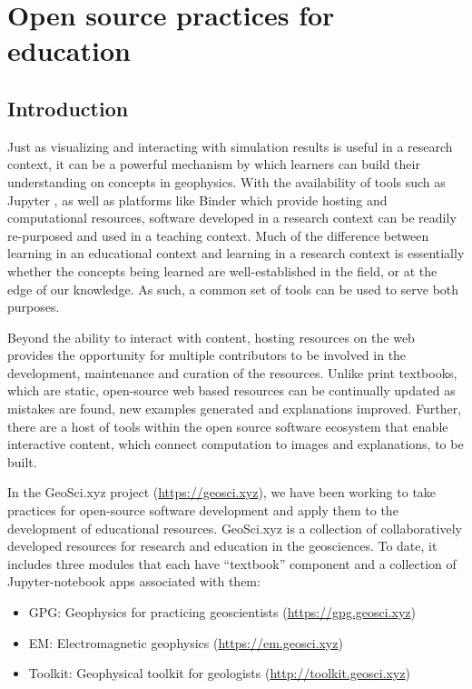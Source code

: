 
\chapter{Open source practices for education}
\label{app:education}

\section{Introduction}
Just as visualizing and interacting with simulation results is useful in a research context, it can be a powerful mechanism by which learners can build their understanding on concepts in geophysics. With the availability of tools such as Jupyter \citep{Perez2015}, as well as platforms like Binder \citep{ProjectJupyter2018} which provide hosting and computational resources, software developed in a research context can be readily re-purposed and used in a teaching context. Much of the difference between learning in an educational context and learning in a research context is essentially whether the concepts being learned are well-established in the field, or at the edge of our knowledge. As such, a common set of tools can be used to serve both purposes.

Beyond the ability to interact with content, hosting resources on the web provides the opportunity for multiple contributors to be involved in the development, maintenance and curation of the resources. Unlike print textbooks, which are static, open-source web based resources can be continually updated as mistakes are found, new examples generated and explanations improved. Further, there are a host of tools within the open source software ecosystem that enable interactive content, which connect computation to images and explanations, to be built.

In the GeoSci.xyz project (\href{https://geosci.xyz}{https://geosci.xyz}), we have been working to take practices for open-source software development and apply them to the development of educational resources. GeoSci.xyz is a collection of collaboratively developed resources for research and education in the geosciences. To date, it includes three modules that each have ``textbook'' component and a collection of Jupyter-notebook apps associated with them:
\begin{itemize}
    \item GPG: Geophysics for practicing geoscientists (\href{https://gpg.geosci.xyz}{https://gpg.geosci.xyz})
    \item EM: Electromagnetic geophysics (\href{https://em.geosci.xyz}{https://em.geosci.xyz})
    \item Toolkit: Geophysical toolkit for geologists (\href{http://toolkit.geosci.xyz}{http://toolkit.geosci.xyz})
\end{itemize}

